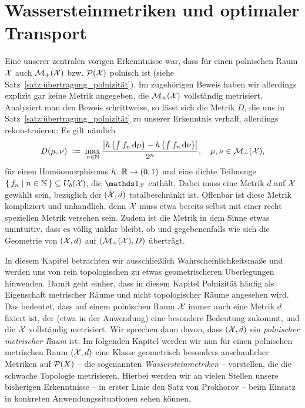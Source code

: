 \documentclass[../thesis/thesis.tex]{subfiles}
\begin{document}
	
	\chapter{Wassersteinmetriken und optimaler Transport}
	\label{chap:wassersteinmetriken}
	
	Eine unserer zentralen vorigen Erkenntnisse war, dass für einen polnischen Raum $\mathcal{X}$ auch $\mathcal{M}_{+}(\mathcal{X})$ bzw. $\mathcal{P}(\mathcal{X})$ polnisch ist (siehe Satz~\ref{satz:übertragung_polnizität}). 
	Im zugehörigen Beweis haben wir allerdings explizit gar keine Metrik angegeben, die $\mathcal{M}_{+}(\mathcal{X})$ vollständig metrisiert. Analysiert man den Beweis schrittweise, so lässt sich die Metrik $D$,
	die uns in Satz~\ref{satz:übertragung_polnizität} zu unserer Erkenntnis verhalf, allerdings rekonstruieren: Es gilt nämlich
	\[ D(\mu, \nu) \; \vcentcolon = \; \max_{n \in \mathbb{N}} \frac{\left| h\left( \int_{} \, f_n \, \mathrm{d}\mu \right) - h\left(\int_{} \, f_n \, \mathrm{d}\nu \right) \right|}{2^n}, \quad \mu, \nu \in \mathcal{M}_{+}(\mathcal{X}) \text{,} \]
	für einen Homöomorphismus $h \colon \mathbb{R} \to (0, 1)$ und eine dichte Teilmenge $\left\{\, f_n \; \middle| \; n \in \mathbb{N} \,\right\} \subseteq U_b(\mathcal{X})$, die $\indfct_{\X}$ enthält. Dabei muss eine Metrik $d$ auf $\mathcal{X}$ gewählt sein, 
	bezüglich der $(\mathcal{X}, d)$ totalbeschränkt ist.
	Offenbar ist diese Metrik kompliziert und unhandlich, denn $\mathcal{X}$ muss etwa bereits selbst mit einer recht speziellen Metrik versehen sein. Zudem ist die Metrik in dem Sinne etwas unintuitiv, dass es völlig unklar bleibt, 
	ob und gegebenenfalls wie sich die Geometrie von $(\mathcal{X}, d)$ auf $(\mathcal{M}_{+}(\mathcal{X}), D)$ überträgt.
	
	In diesem Kapitel betrachten wir ausschließlich Wahrscheinlichkeitsmaße und werden uns von rein topologischen zu etwas geometrischeren Überlegungen hinwenden. Damit geht einher, dass in diesem Kapitel
	Polnizität häufig als Eigenschaft metrischer Räume und nicht topologischer Räume angesehen wird. Das bedeutet, dass auf einem polnischen Raum $\mathcal{X}$ immer auch eine Metrik $d$ fixiert ist, der (etwa in der Anwendung)
	eine besondere Bedeutung zukommt, und die $\mathcal{X}$ vollständig metrisiert. Wir sprechen dann davon, dass $(\mathcal{X}, d)$ ein \emph{polnischer metrischer Raum} ist.
	Im folgenden Kapitel werden wir nun für einen polnischen metrischen Raum $(\mathcal{X}, d)$ eine Klasse geometrisch besonders anschaulicher Metriken auf $\mathcal{P}(X)$
	-- die sogenannten \emph{Wassersteinmetriken} -- vorstellen, die die schwache Topologie metrisieren. Hierbei werden wir an vielen Stellen unsere bisherigen 
	Erkenntnisse -- in erster Linie den Satz von Prokhorov -- beim Einsatz in konkreten Anwendungssituationen sehen können. 
	
\end{document}
